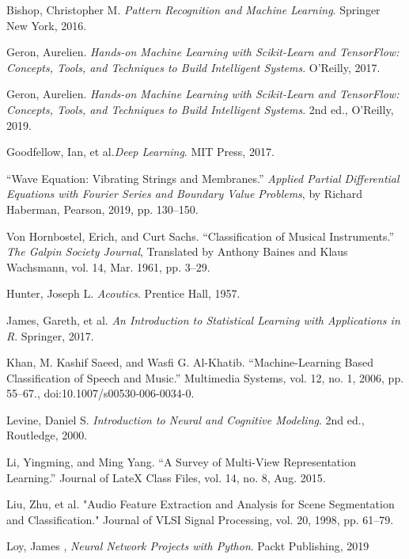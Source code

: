 \documentclass[12pt,letterpaper]{article}
\begin{document}
\begin{thebibliography}{9}


Bishop, Christopher M. \textit{Pattern Recognition and Machine Learning}. Springer New York, 2016. 

Geron, Aurelien. \textit{Hands-on Machine Learning with Scikit-Learn and TensorFlow: Concepts, Tools, and Techniques to Build Intelligent Systems}. O'Reilly, 2017.

Geron, Aurelien. \textit{Hands-on Machine Learning with Scikit-Learn and TensorFlow: Concepts, Tools, and Techniques to Build Intelligent Systems}. 2nd ed., O'Reilly, 2019.

Goodfellow, Ian, et al.\textit{Deep Learning}. MIT Press, 2017.

“Wave Equation: Vibrating Strings and Membranes.” \textit{Applied Partial Differential Equations with Fourier Series and Boundary Value Problems}, by Richard Haberman, Pearson, 2019, pp. 130–150. 

Von Hornbostel, Erich, and Curt Sachs. “Classification of Musical Instruments.” \textit{The Galpin Society Journal}, Translated by Anthony Baines and Klaus Wachsmann, vol. 14, Mar. 1961, pp. 3–29. 

Hunter, Joseph L. \textit{Acoutics}. Prentice Hall, 1957. 

James, Gareth, et al. \textit{An Introduction to Statistical Learning with Applications in R}. Springer, 2017.

Khan, M. Kashif Saeed, and Wasfi G. Al-Khatib. “Machine-Learning Based Classification of Speech and Music.” Multimedia Systems, vol. 12, no. 1, 2006, pp. 55–67., doi:10.1007/s00530-006-0034-0.

Levine, Daniel S. \textit{Introduction to Neural and Cognitive Modeling}. 2nd ed., Routledge, 2000.

Li, Yingming, and Ming Yang. “A Survey of Multi-View Representation Learning.” Journal of LateX Class Files, vol. 14, no. 8, Aug. 2015. 

Liu, Zhu, et al. "Audio Feature Extraction and Analysis for Scene Segmentation and Classification." Journal of VLSI Signal Processing, vol. 20, 1998, pp. 61–79.

Loy, James , \textit{Neural Network Projects with Python}. Packt Publishing, 2019


\end{thebibliography}
\end{document}
